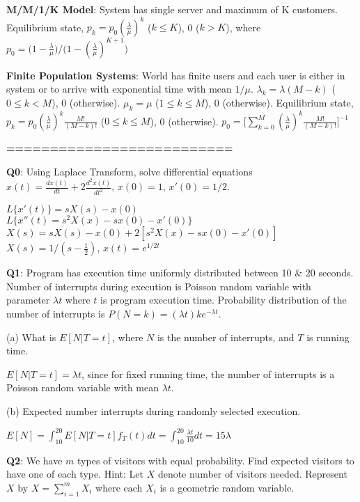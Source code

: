 \documentclass{scrartcl}
\begin{document}
\begin{multicols*}{3}
{\bf M/M/1/K Model}: System has single server and maximum of K customers. Equilibrium state, $p_k=p_0(\frac{\lambda}{\mu})^k$ ($k\leq K$), 0 ($k>K$), where $p_0=\Big(1-\frac{\lambda}{\mu}\Big)/\Big(1-(\frac{\lambda}{\mu})^{K+1}\Big)$


{\bf Finite Population Systems}: World has finite users and each user is either in system or to arrive with exponential time with mean $1/\mu$. $\lambda_k=\lambda(M-k)$ ($0\leq k<M$), 0 (otherwise). $\mu_k=\mu$ ($1\leq k\leq M$), 0 (otherwise). Equilibrium state, $p_k=p_0(\frac{\lambda}{\mu})^k\frac{M!}{(M-k)!}$ ($0\leq k\leq M$), 0 (otherwise). $p_0=\Big[\sum_{k=0}^M(\frac{\lambda}{\mu})^k\frac{M!}{(M-k)!}\Big]^{-1}$



{\bf ==========================}



{\bf Q0}: Using Laplace Transform, solve differential equations $x(t)=\frac{dx(t)}{dt}+2\frac{d^2x(t)}{dt^2}$, $x(0)=1$, $x'(0)=1/2$.

$L\{x'(t)\}=sX(s)-x(0)$\\
$L\{x''(t)=s^2X(x)-sx(0)-x'(0)\}$\\
$X(s)=sX(s)-x(0)+2[s^2X(x)-sx(0)-x'(0)]$\\
$X(s)=1/(s-\frac{1}{2})$, $x(t)=e^{1/2t}$


{\bf Q1}: Program has execution time uniformly distributed between 10 \& 20 seconds. Number of interrupts during execution is Poisson random variable with parameter $\lambda t$ where $t$ is program execution time. Probability distribution of the number of interrupts is $P(N = k) = (\lambda t)ke^{−\lambda t}$.

(a) What is $E[N|T = t]$, where $N$ is the number of interrupts, and $T$ is running time.

$E[N|T = t] = \lambda t$, since for fixed running time, the number of interrupts is a Poisson random variable with mean $\lambda t$.

(b) Expected number interrupts during randomly selected execution.

$E[N] = \int_{10}^{20} E[N|T=t]f_T(t)dt = \int_{10}^{20}\frac{\lambda t}{10}dt = 15\lambda$



{\bf Q2}: We have $m$ types of visitors with equal probability. Find expected visitors to have one of each type. Hint: Let $X$ denote number of visitors needed. Represent $X$ by $X=\sum_{i=1}^mX_i$ where each $X_i$ is a geometric random variable.


\end{multicols*}
\end{document}
